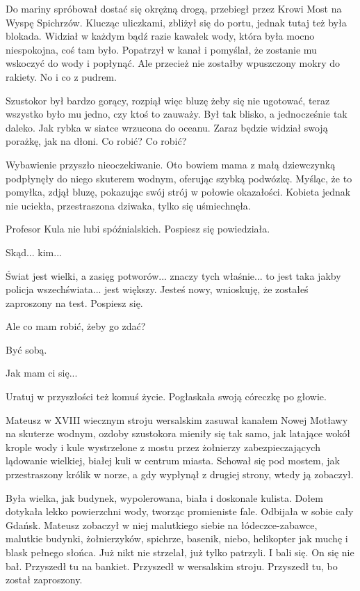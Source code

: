 Do mariny spróbował dostać się okrężną drogą, przebiegł przez Krowi Most na Wyspę Spichrzów.
Klucząc uliczkami, zbliżył się do portu, jednak tutaj też była blokada.
Widział w każdym bądź razie kawałek wody, która była mocno niespokojna, coś tam było.
Popatrzył w kanał i pomyślał, że zostanie mu wskoczyć do wody i popłynąć.
Ale przecież nie zostałby wpuszczony mokry do rakiety.
No i co z pudrem.

Szustokor był bardzo gorący, rozpiął więc bluzę żeby się nie ugotować, teraz wszystko było mu jedno, czy ktoś to zauważy.
Był tak blisko, a jednocześnie tak daleko.
Jak rybka w siatce wrzucona do oceanu.
Zaraz będzie widział swoją porażkę, jak na dłoni.
Co robić? Co robić?

Wybawienie przyszło nieoczekiwanie.
Oto bowiem mama z małą dziewczynką podpłynęły do niego skuterem wodnym, oferując szybką podwózkę.
Myśląc, że to pomyłka, zdjął bluzę, pokazując swój strój w połowie okazałości.
Kobieta jednak nie uciekła, przestraszona dziwaka, tylko się uśmiechnęła.

\ds{} Profesor Kula nie lubi spóźnialskich. Pospiesz się \dm{} powiedziała. \de{}

\ds{} Skąd... kim... \de{}

\ds{} Świat jest wielki, a zasięg potworów... znaczy tych właśnie... to jest taka jakby policja wszechświata... jest większy.
Jesteś nowy, wnioskuję, że zostałeś zaproszony na test. Pospiesz się.\de{}

\ds{} Ale co mam robić, żeby go zdać? \de{}

\ds{} Być sobą. \de{}

\ds{} Jak mam ci się... \de{}

\ds{} Uratuj w przyszłości też komuś życie. \dm{} Pogłaskała swoją córeczkę po głowie. \de{}

Mateusz w XVIII wiecznym stroju wersalskim zasuwał kanałem Nowej Motławy na skuterze wodnym, ozdoby szustokora mieniły się tak samo, jak latające wokół 
krople wody i kule wystrzelone z mostu przez żołnierzy zabezpieczających
lądowanie wielkiej, białej kuli w centrum miasta. 
Schował się pod mostem, jak przestraszony królik w norze, a gdy wypłynął z drugiej strony, wtedy ją zobaczył.

Była wielka, jak budynek, wypolerowana, biała i doskonale kulista.
Dołem dotykała lekko powierzchni wody, tworząc promieniste fale.
Odbijała w sobie cały Gdańsk.
Mateusz zobaczył w niej malutkiego siebie na łódeczce-zabawce, malutkie budynki, żołnierzyków, spichrze, basenik, niebo, helikopter jak muchę i blask pełnego słońca.
Już nikt nie strzelał, już tylko patrzyli. I bali się.
On się nie bał. Przyszedł tu na bankiet.
Przyszedł w wersalskim stroju.
Przyszedł tu, bo został zaproszony.


